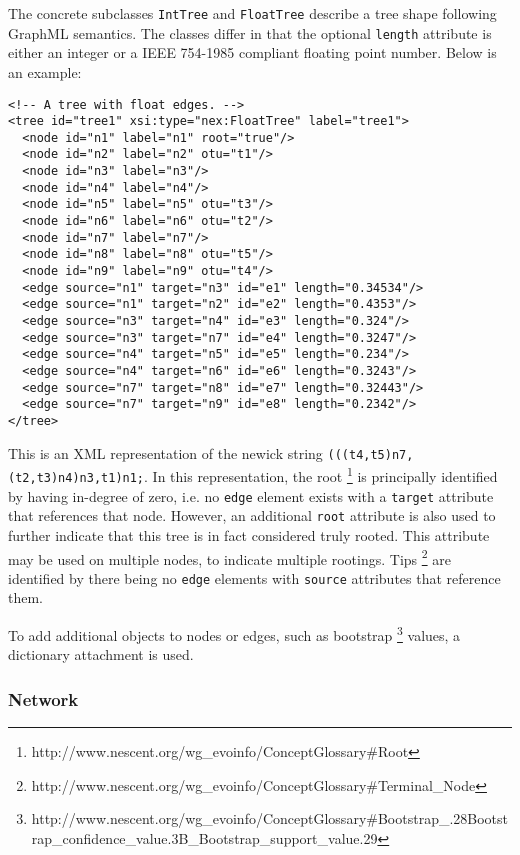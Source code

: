 \documentclass{article}
\newcommand{\code}{\texttt}
\begin{document}
The concrete subclasses \code{IntTree} and \code{FloatTree} describe a tree shape following GraphML semantics. The 
classes differ in that the optional \code{length} attribute is either an integer or a IEEE 754-1985 compliant floating 
point number. Below is an example:
\begin{verbatim}
<!-- A tree with float edges. -->
<tree id="tree1" xsi:type="nex:FloatTree" label="tree1">
  <node id="n1" label="n1" root="true"/>
  <node id="n2" label="n2" otu="t1"/>
  <node id="n3" label="n3"/>
  <node id="n4" label="n4"/>
  <node id="n5" label="n5" otu="t3"/>
  <node id="n6" label="n6" otu="t2"/>
  <node id="n7" label="n7"/>
  <node id="n8" label="n8" otu="t5"/>
  <node id="n9" label="n9" otu="t4"/>
  <edge source="n1" target="n3" id="e1" length="0.34534"/>			
  <edge source="n1" target="n2" id="e2" length="0.4353"/>
  <edge source="n3" target="n4" id="e3" length="0.324"/>
  <edge source="n3" target="n7" id="e4" length="0.3247"/>
  <edge source="n4" target="n5" id="e5" length="0.234"/>
  <edge source="n4" target="n6" id="e6" length="0.3243"/>
  <edge source="n7" target="n8" id="e7" length="0.32443"/>
  <edge source="n7" target="n9" id="e8" length="0.2342"/>
</tree>
\end{verbatim}
This is an XML representation of the newick string \code{(((t4,t5)n7,(t2,t3)n4)n3,t1)n1;}. In this representation, the 
root \footnote{http://www.nescent.org/wg\_evoinfo/ConceptGlossary\#Root} is principally identified by having in-degree of zero, i.e. 
no \code{edge} element exists with a \code{target} attribute that references that node. However, an additional 
\code{root} attribute is also used to further indicate that this tree is in fact considered truly rooted. This attribute 
may be used on multiple nodes, to indicate multiple rootings. Tips 
\footnote{http://www.nescent.org/wg\_evoinfo/ConceptGlossary\#Terminal\_Node} are identified by there being no \code{edge} elements 
with \code{source} attributes that reference them. 

To add additional objects to nodes or edges, such as bootstrap 
\footnote{http://www.nescent.org/wg\_evoinfo/ConceptGlossary\#Bootstrap\_.28Bootstrap\_confidence\_value.3B\_Bootstrap\_support\_value.29} 
values, a dictionary attachment is used.

\subsubsection{Network}
\end{document}
